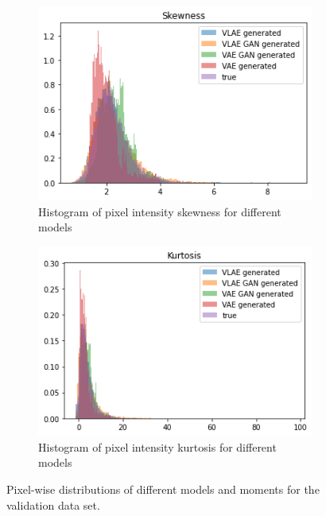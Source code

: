 \begin{figure}
\begin{subfigure}{0.48\textwidth}
        \centering
        \includegraphics[width=\textwidth]{images/generated_vs_true/mnist_vs_models_skew.png}
        \caption{Histogram of pixel intensity skewness for different models}
        \label{subfig:skew_generated_vs_true}
    \end{subfigure}
    \hfill
    \begin{subfigure}{0.48\textwidth}
        \centering
        \includegraphics[width=\textwidth]{images/generated_vs_true/mnist_vs_models_kurt.png}
        \caption{Histogram of pixel intensity kurtosis for different models}
        \label{subfig:kurt_generated_vs_true}
    \end{subfigure}
    \caption[Models on \textsc{Mnist}: Pixel-wise distributions]{Pixel-wise distributions of different models and moments for the validation data set.}
    \label{fig:mean_generated_vs_true}
\end{figure}


